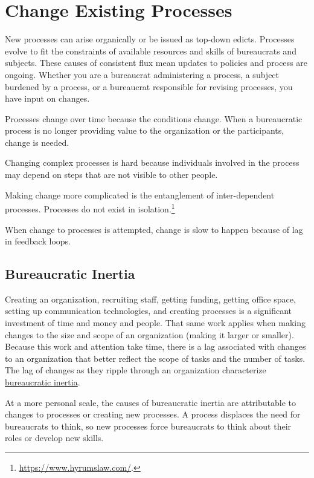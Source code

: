 \section{Change Existing Processes\label{sec:change-a-process}}

New processes can arise organically or be issued as top-down edicts. Processes evolve to fit the constraints of available resources and skills of bureaucrats and subjects. These causes of consistent flux mean updates to policies and process are ongoing. Whether you are a bureaucrat administering a process, a subject burdened by a process, or a bureaucrat responsible for revising processes, you have input on changes.



Processes change over time because the conditions change. When a bureaucratic process is no longer providing value to the organization or the participants, change is needed. 

Changing complex processes is hard because individuals involved in the process may depend on steps that are not visible to other people.

Making change more complicated is the entanglement of inter-dependent processes. Processes do not exist in isolation.\footnote{\href{https://www.hyrumslaw.com/}{https://www.hyrumslaw.com/}.} %

When change to processes is attempted, change is slow to happen because of lag in feedback loops. 

\subsection*{Bureaucratic Inertia}

Creating an organization, recruiting staff, getting funding, getting office space, setting up communication technologies, and creating processes is a significant investment of time and money and people. 
That same work applies when making changes to the size and scope of an organization (making it larger or smaller). 
Because this work and attention take time, there is a lag associated with changes to an organization that better reflect the scope of tasks and the number of tasks. 
The lag of changes as they ripple through an organization characterize \href{https://en.wikipedia.org/wiki/Bureaucratic_inertia}{bureaucratic inertia}. 

At a more personal scale, the causes of bureaucratic inertia are attributable to changes to processes or creating new processes. A process displaces the need for bureaucrats to think, so new processes force bureaucrats to think about their roles or develop new skills. 


